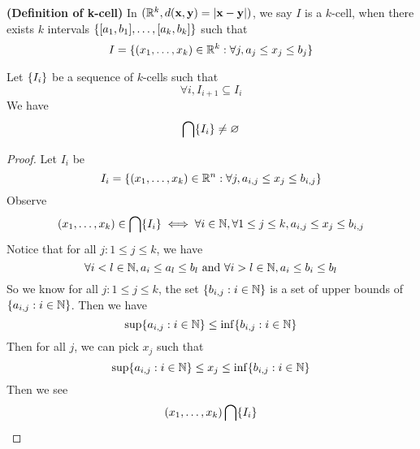 \documentclass{report}
\begin{document}
\begin{definition}
\label{2.8.7}
\textbf{(Definition of k-cell)} In $(\mathbb{R}^k,d(\textbf{x},\textbf{y})=|\textbf{x}-\textbf{y}|)$,  we say $I$ is a $k$-cell, when there exists  $k$ intervals  $\{ [a_1,b_1],\dots , [a_k,b_k] \}$ such that
 \begin{equation}
   I=\{ (x_1,\dots , x_k)\in \mathbb{R}^k: \forall j, a_j\leq x_j\leq b_j  \}
\end{equation}
\end{definition}
\begin{lemma}
\label{2.8.8}
Let $\{ I_i \}$ be a sequence of $k$-cells such that
 \begin{equation}
\forall i, I_{i+1}\subseteq I_i
\end{equation}
We have
\begin{equation}
\bigcap \{ I_i \}\neq \varnothing
\end{equation}
\end{lemma}
\begin{proof}
Let $I_i$ be 
 \begin{equation}
I_i=\{ (x_1,\dots , x_k)\in \mathbb{R}^n: \forall j, a_{i,j}\leq x_j\leq b_{i,j} \}
\end{equation}
Observe
\begin{equation}
  (x_1,\dots , x_k)\in \bigcap \{ I_i \}\iff \forall i \in\mathbb{N},\forall 1\leq j\leq k, a_{i,j}\leq x_j\leq b_{i,j}
\end{equation}
Notice that for all $j:1\leq j\leq k$, we have
\begin{equation}
\forall i<l\in\mathbb{N}, a_i\leq a_l\leq b_l\text{ and }\forall i>l\in\mathbb{N}, a_i\leq b_i\leq b_l
\end{equation}
So we know for all $j:1\leq j\leq k$, the set $\{ b_{i,j}:i\in\mathbb{N} \}$ is a set of upper bounds of   $\{ a_{i,j}:i\in\mathbb{N} \}$. Then we have
\begin{equation}
\sup \{ a_{i,j}:i\in\mathbb{N} \}\leq \inf \{ b_{i,j}:i\in\mathbb{N} \}
\end{equation}
Then for all $j$, we can pick $x_j$ such that
 \begin{equation}
\sup \{ a_{i,j}:i\in\mathbb{N} \}\leq x_j\leq \inf \{ b_{i,j}:i\in\mathbb{N} \}
\end{equation}
Then we see 
\begin{equation}
  (x_1,\dots ,x_k)\bigcap \{ I_i \}
\end{equation}
\end{proof}
\end{document}
